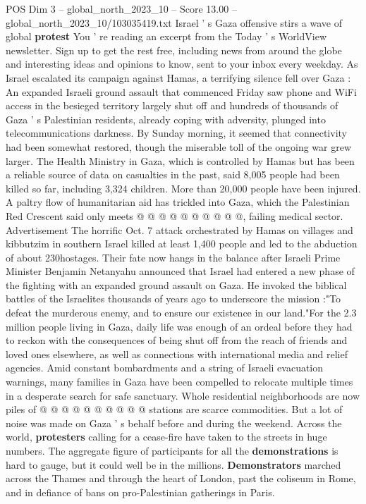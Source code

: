 \begin{textsample}{POS Dim 3 – global\_north\_2023\_10 – Score 13.00 – global\_north\_2023\_10/103035419.txt}  \label{ex:f3_pos_275}
Israel ' s Gaza offensive stirs a wave of global \textbf{protest} You ' re reading an excerpt from the Today ' s WorldView newsletter.
Sign up to get the rest free, including news from around the globe and interesting ideas and opinions to know, sent to your inbox every weekday.
As Israel escalated its campaign against Hamas, a terrifying silence fell over Gaza : An expanded Israeli ground assault that commenced Friday saw phone and WiFi access in the besieged territory largely shut off and hundreds of thousands of Gaza ' s Palestinian residents, already coping with adversity, plunged into telecommunications darkness.
By Sunday morning, it seemed that connectivity had been somewhat restored, though the miserable toll of the ongoing war grew larger.
The Health Ministry in Gaza, which is controlled by Hamas but has been a reliable source of data on casualties in the past, said 8,005 people had been killed so far, including 3,324 children.
More than 20,000 people have been injured.
A paltry flow of humanitarian aid has trickled into Gaza, which the Palestinian Red Crescent said only meets @ @ @ @ @ @ @ @ @ @, failing medical sector.
Advertisement The horrific Oct. 7 attack orchestrated by Hamas on villages and kibbutzim in southern Israel killed at least 1,400 people and led to the abduction of about 230hostages.
Their fate now hangs in the balance after Israeli Prime Minister Benjamin Netanyahu announced that Israel had entered a new phase of the fighting with an expanded ground assault on Gaza.
He invoked the biblical battles of the Israelites thousands of years ago to underscore the mission :"To defeat the murderous enemy, and to ensure our existence in our land."For the 2.3 million people living in Gaza, daily life was enough of an ordeal before they had to reckon with the consequences of being shut off from the reach of friends and loved ones elsewhere, as well as connections with international media and relief agencies.
Amid constant bombardments and a string of Israeli evacuation warnings, many families in Gaza have been compelled to relocate multiple times in a desperate search for safe sanctuary.
Whole residential neighborhoods are now piles of @ @ @ @ @ @ @ @ @ @ stations are scarce commodities.
But a lot of noise was made on Gaza ' s behalf before and during the weekend.
Across the world, \textbf{protesters} calling for a cease-fire have taken to the streets in huge numbers.
The aggregate figure of participants for all the \textbf{demonstrations} is hard to gauge, but it could well be in the millions. \textbf{Demonstrators} marched across the Thames and through the heart of London, past the coliseum in Rome, and in defiance of bans on pro-Palestinian gatherings in Paris.

\end{textsample}
